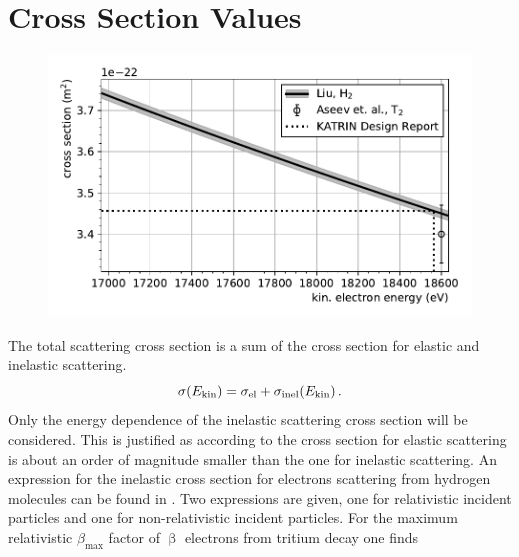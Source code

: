 \section{Cross Section Values}
\begin{figure}[t]
    \centering
    \includegraphics[width=\textwidth]{chapter/energyDependentCrossSec/fig/crossSecNoZoom.pdf}
    \label{fig:scatCrossSec}
\end{figure}
The total scattering cross section is a sum of the cross section for elastic and inelastic scattering.
\begin{equation}
    \sigma(E_\mathrm{kin}) = \sigma_\mathrm{el} + \sigma_\mathrm{inel}(E_\mathrm{kin})
    \text{\,.}
\end{equation}
Only the energy dependence of the inelastic scattering cross section will be considered. This is justified as according to \cite{Angrik:2005ep} the cross section for elastic scattering is about an order of magnitude smaller than the one for inelastic scattering. An expression for the inelastic cross section for electrons scattering from hydrogen molecules can be found in \cite{Liu1973}. Two expressions are given, one for relativistic incident particles and one for non-relativistic incident particles. For the maximum relativistic $\beta_\mathrm{max}$ factor of $\upbeta$ electrons from tritium decay one finds
